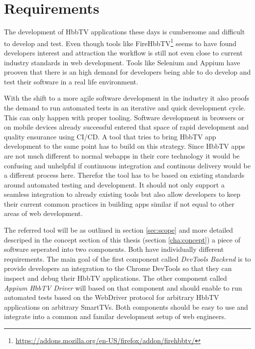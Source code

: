\chapter{Requirements\label{cha:chapter3}}

The development of HbbTV applications these days is cumbersome and difficult to develop and test.
Even though tools like FireHbbTV\footnote{\url{https://addons.mozilla.org/en-US/firefox/addon/firehbbtv/}}
seems to have found developers interest and attraction the workflow is still not even close to
current industry standards in web development. Tools like Selenium and Appium have prooven that
there is an high demand for developers being able to do develop and test their software in a real
life environment.

With the shift to a more agile software development in the industry it also proofs the demand
to run automated tests in an iterative and quick development cycle. This can only happen
with proper tooling. Software development in browsers or on mobile devices already successful
entered that space of rapid development and quality ensurance using CI/CD. A tool that
tries to bring HbbTV app development to the same point has to build on this strategy. Since
HbbTV apps are not much different to normal webapps in their core technology it would be confusing
and unhelpful if continuous integration and continous delivery would be a different process here.
Therefor the tool has to be based on existing standards around automated testing and development.
It should not only support a seamless integration to already existing tools but also allow
developers to keep their current common practices in building apps similar if not equal to other
areas of web development.

The referred tool will be as outlined in section \ref{sec:scope} and more detailed descriped in
the concept section of this thesis (section \ref{cha:concept}) a piece of software seperated
into two components. Both have individually different requirements. The main goal of the first
component called \textit{DevTools Backend} is to provide developers an integration to the
Chrome DevTools so that they can inspect and debug their HbbTV applications. The other
component called \textit{Appium HbbTV Driver} will based on that component and should enable
to run automated tests based on the WebDriver protocol for arbitrary HbbTV applications on
arbitrary SmartTVs. Both components should be easy to use and integrate into a common and
familar development setup of web engineers.

